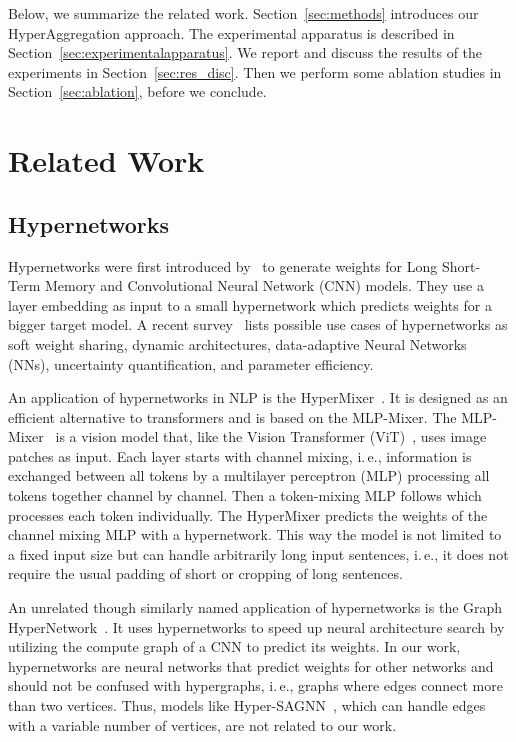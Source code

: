 \documentclass[conference]{IEEEtran}
\newcommand{\ie}{i.\,e.,\xspace}
\begin{document}
Below, we summarize the related work.
Section~\ref{sec:methods} introduces our HyperAggregation approach.
The experimental apparatus is described in Section~\ref{sec:experimentalapparatus}.
We report and discuss the results of the experiments in Section~\ref{sec:res_disc}. 
Then we perform some ablation studies in Section~\ref{sec:ablation}, before we conclude.

\section{Related Work}
\label{sec:relatedwork}


\subsection{Hypernetworks}

Hypernetworks were first introduced by~\citet{DBLP:conf/iclr/HaDL17} to generate weights for Long Short-Term Memory and Convolutional Neural Network (CNN) models.
They use a layer embedding as input to a small hypernetwork which predicts weights for a bigger target model.
A recent survey~\citep{surv:hyp} lists possible use cases of hypernetworks as soft weight sharing, dynamic architectures, data-adaptive Neural Networks (NNs), uncertainty quantification, and parameter efficiency.

An application of hypernetworks in NLP is the HyperMixer~\citep{DBLP:conf/acl/MaiPFCMF023}.
It is designed as an efficient alternative to transformers and is based on the MLP-Mixer.
The MLP-Mixer~\citep{DBLP:conf/nips/TolstikhinHKBZU21} is a vision model that, like the Vision Transformer (ViT)~\citep{DBLP:conf/iclr/DosovitskiyB0WZ21}, uses image patches as input.
Each layer starts with channel mixing, \ie information is exchanged between all tokens by a multilayer perceptron (MLP) processing all tokens together channel by channel.
Then a token-mixing MLP follows which processes each token individually.
The HyperMixer predicts the weights of the channel mixing MLP with a hypernetwork.
This way the model is not limited to a fixed input size but can handle arbitrarily long input sentences, \ie it does not require the usual padding of short or cropping of long sentences. 

An unrelated though similarly named application of hypernetworks is the Graph HyperNetwork~\citep{DBLP:conf/iclr/ZhangRU19}.
It uses hypernetworks to speed up neural architecture search by utilizing the compute graph of a CNN to predict its weights.
In our work, hypernetworks are neural networks that predict weights for other networks and should not be confused with hypergraphs, \ie graphs where edges connect more than two vertices.
Thus, models like Hyper-SAGNN~\cite{DBLP:conf/iclr/ZhangZ020}, which can handle edges with a variable number of vertices, are not related to our work.
\end{document}
